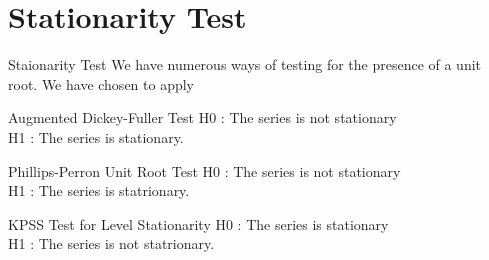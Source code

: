\documentclass{beamer}
\begin{document}
	\section{Stationarity Test}
	

	\begin{frame}{Staionarity Test}
		We have numerous ways of testing for the presence of a unit root. 
		We have chosen to apply
		
		\begin{block}{Augmented Dickey-Fuller Test}
			H0 : The series is not stationary \\
			H1 : The series is stationary. \vspace{5pt}
		\end{block}
	
		\begin{exampleblock}{Phillips-Perron Unit Root Test}
			H0 : The series is not stationary \\
			H1 : The series is statrionary. \vspace{5pt}
		\end{exampleblock}
		
		\begin{alertblock}{KPSS Test for Level Stationarity}
			H0 : The series is stationary \\
			H1 : The series is not statrionary. \vspace{5pt}
		\end{alertblock}
	\end{frame}
	
\end{document}
